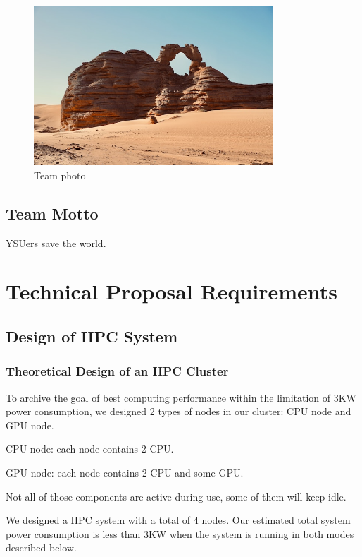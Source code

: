 \documentclass[a4paper,12pt]{article}
\begin{document}
\begin{figure}[H]
    \centering
    \includegraphics[width=0.8\textwidth]{Team_Photo.png}
    \caption{Team photo}
    \label{fig:team_photo}
\end{figure}


\subsection{Team Motto}

YSUers save the world.

\newpage

\section{Technical Proposal Requirements}

\subsection{Design of HPC System}

\subsubsection{Theoretical Design of an HPC Cluster}

To archive the goal of best computing performance within the limitation of 3KW power consumption, we designed 2 types of nodes in our cluster: CPU node and GPU node.

CPU node: each node contains 2 CPU.

GPU node: each node contains 2 CPU and some GPU.

Not all of those components are active during use, some of them will keep idle.

We designed a HPC system with a total of 4 nodes. Our estimated total system power consumption is less than 3KW when the system is running in both modes described below.
\end{document}
